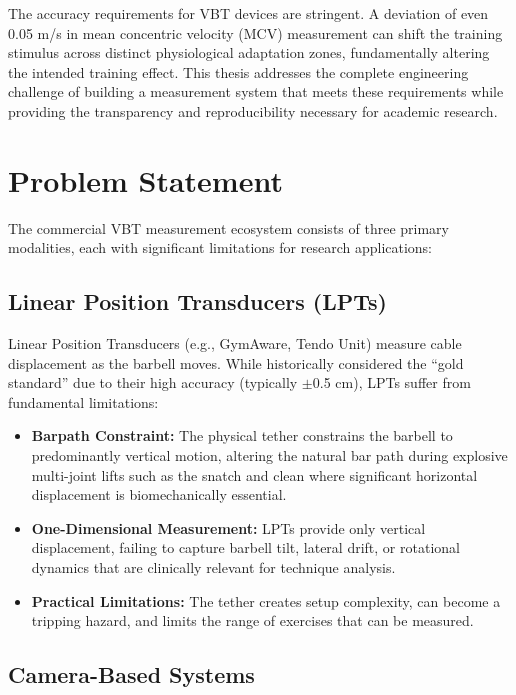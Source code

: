 The accuracy requirements for VBT devices are stringent. A deviation of even 0.05 m/s in mean concentric velocity (MCV) measurement can shift the training stimulus across distinct physiological adaptation zones, fundamentally altering the intended training effect. This thesis addresses the complete engineering challenge of building a measurement system that meets these requirements while providing the transparency and reproducibility necessary for academic research.

\section{Problem Statement}

The commercial VBT measurement ecosystem consists of three primary modalities, each with significant limitations for research applications:

\subsection{Linear Position Transducers (LPTs)}

Linear Position Transducers (e.g., GymAware, Tendo Unit) measure cable displacement as the barbell moves. While historically considered the ``gold standard'' due to their high accuracy (typically $\pm$0.5 cm), LPTs suffer from fundamental limitations:

\begin{itemize}
    \item \textbf{Barpath Constraint:} The physical tether constrains the barbell to predominantly vertical motion, altering the natural bar path during explosive multi-joint lifts such as the snatch and clean where significant horizontal displacement is biomechanically essential.

    \item \textbf{One-Dimensional Measurement:} LPTs provide only vertical displacement, failing to capture barbell tilt, lateral drift, or rotational dynamics that are clinically relevant for technique analysis.

    \item \textbf{Practical Limitations:} The tether creates setup complexity, can become a tripping hazard, and limits the range of exercises that can be measured.
\end{itemize}

\subsection{Camera-Based Systems}

